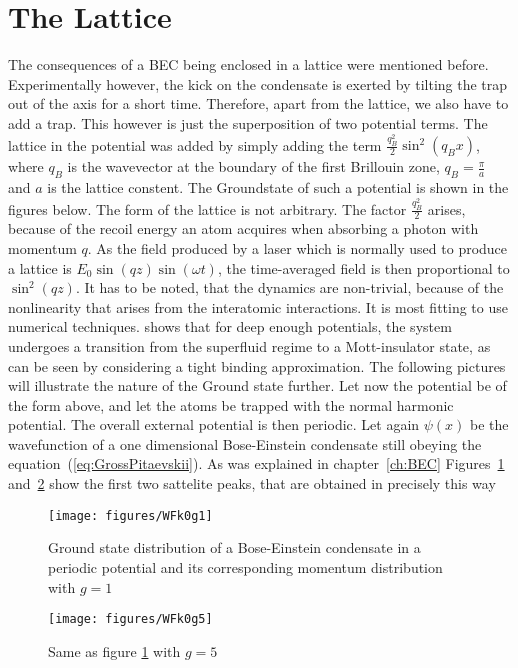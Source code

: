 \section{The Lattice}
The consequences of a BEC being enclosed in a lattice were mentioned before. Experimentally however, the kick on the condensate is exerted by tilting the trap out of the axis for a short time. Therefore, apart from the lattice, we also have to add a trap. This however is just the superposition of 
two potential terms. 
The lattice in the potential was added by simply adding the term $\frac{q_B^2}{2}\sin^2(q_Bx)$\cite{menotti}, where $q_B$ is the wavevector 
at the boundary of the first Brillouin zone, $q_B=\frac{\pi}{a}$ and $a$ is the lattice constent. The Groundstate of such a potential is shown 
in the figures below. 
The form of the lattice is not arbitrary. The factor $\frac{q_B^2}{2}$ arises, because of the recoil energy an atom acquires when absorbing a 
photon with momentum $q$. As the field produced by a laser which is normally used to produce a lattice is $E_0\sin(qz)\sin(\omega t)$, the time-averaged 
field is then proportional to $\sin^2(qz)$\cite{pitaevskii}.
It has to be noted, that the dynamics are non-trivial, because of the nonlinearity that arises from the interatomic interactions. It is most fitting to 
use numerical techniques.\cite{menotti} shows that for deep enough potentials, the system undergoes a transition from the superfluid regime to a Mott-insulator 
state, as can be seen by considering a tight binding approximation. The following pictures will illustrate the nature of the Ground state further. 
Let now the potential be of the form above, and let the atoms be trapped with the normal harmonic potential. The overall external potential is then periodic. 
Let again $\psi(x)$ be the wavefunction of a one dimensional Bose-Einstein condensate still obeying the equation~(\ref{eq:GrossPitaevskii}). As was explained in
chapter~\ref{ch:BEC}
Figures~\ref{fig:WFk0g1} and~\ref{fig:WFk0g5} show the first two sattelite peaks, that 
are obtained in precisely this way
\begin{figure}[H]
\begin{center}
\texttt{[image: figures/WFk0g1]}
\caption{Ground state distribution of a Bose-Einstein condensate in a periodic potential and its corresponding momentum distribution with
		$g=1$}
\label{fig:WFk0g1}
\end{center}
\end{figure}


\begin{figure}[H]
\begin{center}
\texttt{[image: figures/WFk0g5]}
\caption{Same as figure \ref{fig:WFk0g1} with $g=5$}
\label{fig:WFk0g5}
\end{center}
\end{figure}

